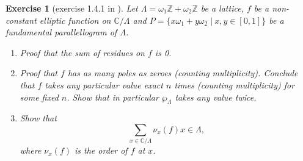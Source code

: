 \documentclass[a4paper]{article}
\theoremstyle{theoremdd}
\theoremstyle{definitiondd}
\theoremstyle{remarkdd}
\newtheorem{exercise}[theorem]{Exercise}
\newcommand{\Z}{\mathbb{Z}}
\newcommand{\C}{\mathbb{C}}
\begin{document}
\begin{exercise}[exercise 1.4.1 in \cite{diamondFirstCourseModular2005a}] \label{ex:1.4.1}
	Let $\Lambda = \omega_1 \Z + \omega_2 \Z$ be a lattice,  $f$ be a non-constant elliptic function on $\C / \Lambda$ and $P = \{x \omega_1 + y\omega_2 \;|\: x, y \in [0,1]\} $ be a fundamental parallellogram of $\Lambda$.
	 \begin{enumerate}
		\item Proof that the sum of residues on $f$ is 0. 
		\item Proof that $f$ has as many poles as zeroes (counting multiplicity). 
			Conclude that $f$ takes any particular value exact  $n$ times (counting multiplicity) for some fixed $n$. Show that in particular  $\wp_\Lambda$ takes any value twice.
		\item Show that 
			\[
				\sum_{x \in \C / \Lambda} \nu_x(f) x \in \Lambda
			,\]
			where $\nu_x(f)$ is the order of $f$ at  $x$. 
	\end{enumerate}
\end{exercise}
\end{document}
